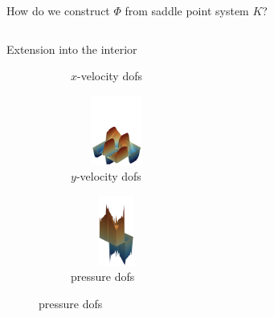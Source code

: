 \begin{frame}{How do we construct $\varPhi$ from saddle point system $K$?}
\begin{columns}
\begin{column}{0.52\textwidth}
{\begin{block}{\normalsize Extension into the interior}
\begin{figure}
\begin{subfigure}{0.29\textwidth}
							\caption{$x$-velocity dofs}
						\end{subfigure}
						\vfill
						\hspace*{-12mm}
						\begin{subfigure}{0.29\textwidth}
							\centering
							\vspace*{-3mm}
							\includegraphics[width=3cm,height=23mm]{images/RGDSW-y-cut.png}
							\vspace*{-5mm}
							\caption{$y$-velocity dofs}
						\end{subfigure}
						\hspace{12mm}
						\begin{subfigure}{0.29\textwidth}
							\centering
							\vspace*{-3mm}
							\includegraphics[width=3cm,height=23mm]{images/RGDSW-p-cut.png}
							\vspace*{-5mm}
							\caption{pressure dofs}
						\end{subfigure}
					\end{figure}
					\vspace{-4mm}
				\end{block}
			}
\end{column}
\end{columns}
\end{frame}
